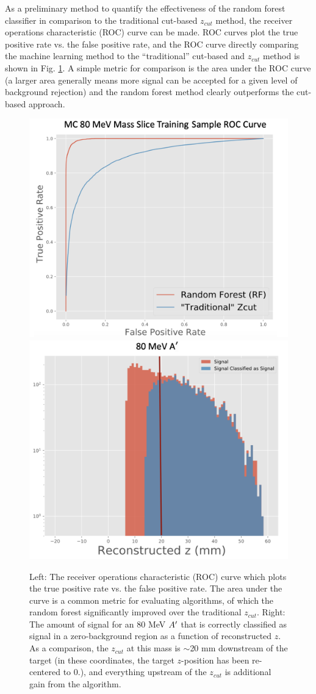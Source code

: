 As a preliminary method to quantify the effectiveness of the random forest classifier in comparison to the traditional cut-based $z_{cut}$ method, the receiver operations characteristic (ROC) curve can be made. ROC curves plot the true positive rate vs. the false positive rate, and the ROC curve directly comparing the machine learning method to the ``traditional'' cut-based and $z_{cut}$ method is shown in Fig. \ref{fig:roccurve}. A simple metric for comparison is the area under the ROC curve (a larger area generally means more signal can be accepted for a given level of background rejection) and the random forest method clearly outperforms the cut-based approach.

\begin{figure}[t]
    \centering
    \includegraphics[width=.45\textwidth]{figs/Results/roc_curve.png}
    \includegraphics[width=.45\textwidth]{figs/Results/clf_z_test.png}
    \caption{Left: The receiver operations characteristic (ROC) curve which plots the true positive rate vs. the false positive rate. The area under the curve is a common metric for evaluating algorithms, of which the random forest significantly improved over the traditional $z_{cut}$. Right: The amount of signal for an 80 MeV $A^\prime$ that is correctly classified as signal in a zero-background region as a function of reconstructed $z$. As a comparison, the $z_{cut}$ at this mass is $\sim$20 mm downstream of the target (in these coordinates, the target $z$-position has been re-centered to 0.), and everything upstream of the $z_{cut}$ is additional gain from the algorithm.}
    \label{fig:roccurve}
\end{figure}

